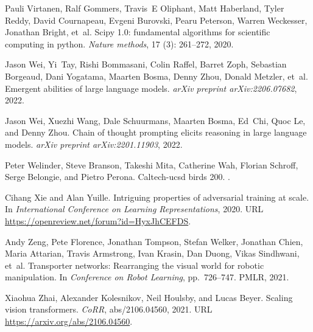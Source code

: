 \documentclass{article} %
\begin{document}
\begin{thebibliography}{62}
Pauli Virtanen, Ralf Gommers, Travis~E Oliphant, Matt Haberland, Tyler Reddy,
  David Cournapeau, Evgeni Burovski, Pearu Peterson, Warren Weckesser, Jonathan
  Bright, et~al.
\newblock Scipy 1.0: fundamental algorithms for scientific computing in python.
\newblock \emph{Nature methods}, 17 (3): 261--272, 2020.

Jason Wei, Yi~Tay, Rishi Bommasani, Colin Raffel, Barret Zoph, Sebastian
  Borgeaud, Dani Yogatama, Maarten Bosma, Denny Zhou, Donald Metzler, et~al.
\newblock Emergent abilities of large language models.
\newblock \emph{arXiv preprint arXiv:2206.07682}, 2022{}.

Jason Wei, Xuezhi Wang, Dale Schuurmans, Maarten Bosma, Ed~Chi, Quoc Le, and
  Denny Zhou.
\newblock Chain of thought prompting elicits reasoning in large language
  models.
\newblock \emph{arXiv preprint arXiv:2201.11903}, 2022{}.

Peter Welinder, Steve Branson, Takeshi Mita, Catherine Wah, Florian Schroff,
  Serge Belongie, and Pietro Perona.
\newblock Caltech-ucsd birds 200.
.

Cihang Xie and Alan Yuille.
\newblock Intriguing properties of adversarial training at scale.
\newblock In \emph{International Conference on Learning Representations}, 2020.
\newblock URL \url{https://openreview.net/forum?id=HyxJhCEFDS}.

Andy Zeng, Pete Florence, Jonathan Tompson, Stefan Welker, Jonathan Chien,
  Maria Attarian, Travis Armstrong, Ivan Krasin, Dan Duong, Vikas Sindhwani,
  et~al.
\newblock Transporter networks: Rearranging the visual world for robotic
  manipulation.
\newblock In \emph{Conference on Robot Learning}, pp.\  726--747. PMLR, 2021.

Xiaohua Zhai, Alexander Kolesnikov, Neil Houlsby, and Lucas Beyer.
\newblock Scaling vision transformers.
\newblock \emph{CoRR}, abs/2106.04560, 2021.
\newblock URL \url{https://arxiv.org/abs/2106.04560}.

\end{thebibliography}
\end{document}
